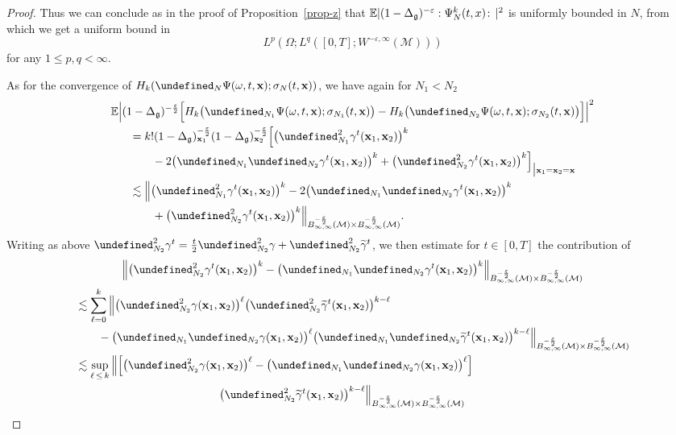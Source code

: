 \documentclass[AHL,Unicode,longabstracts,published]{cedram}
\newcommand{\E}{\mathbb{E}}
\let\P= \undefined
\newcommand{\P}{\mathbf{P}}
\newcommand{\x}{\mathbf{x}}
\newcommand{\M}{\mathcal{M}}
\newcommand{\g}{\mathfrak{g}}
\newcommand{\Dlg}{\Delta_{\g}}
\newcommand{\eps}{\varepsilon}
\newcommand{\s}{\sigma}
\newcommand{\wt}{\widetilde}
\renewcommand{\o}{\omega}
\renewcommand{\O}{\Omega}
\newcommand{\les}{\lesssim}
\begin{document}
\begin{proof}
Thus we can conclude as in the proof of Proposition~\ref{prop-z} that $ \E|(1-\Dlg)^{-\eps}:\linebreak\Psi_N^k(t,x)\!:\,|^2$ is uniformly bounded in $N$, from which we get a uniform bound in 
\[
L^p\left(\O;L^q([0,T];W^{-\eps,\infty}(\M))\right)
\]
for any $1\leq p,q<\infty$.

As for the convergence of $H_k(\P_N\Psi(\o,t,\x);\s_N(t,\x))$, we have again for $N_1< N_2$
\begin{multline*}
\E\Big|(1-\Dlg)^{-\frac\eps2}\Big[H_k\big(\P_{N_1}\Psi(\o,t,\x);\s_{N_1}(t,\x)\big)-H_k\big(\P_{N_2}\Psi(\o,t,\x);\s_{N_2}(t,\x)\big)\Big]\Big|^2\\
\begin{aligned}
&=k!(1-\Dlg)_{\x_1}^{-\frac\eps2}(1-\Dlg)_{\x_2}^{-\frac\eps2}\Big[\big(\P_{N_1}^2\gamma^t(\x_1,\x_2)\big)^k\\
&\qquad-2\big(\P_{N_1}\P_{N_2}\gamma^t(\x_1,\x_2)\big)^k+\big(\P_{N_2}^2\gamma^t(\x_1,\x_2)\big)^k\Big]_{\big|\x_1=\x_2=\x}\\
&\les \Big\|\big(\P_{N_1}^2\gamma^t(\x_1,\x_2)\big)^k-2\big(\P_{N_1}\P_{N_2}\gamma^t(\x_1,\x_2)\big)^k\\
&\qquad+\big(\P_{N_2}^2\gamma^t(\x_1,\x_2)\big)^k\Big\|_{B^{-\frac{\eps}2}_{\infty,\infty}(\M)\times B^{-\frac{\eps}2}_{\infty,\infty}(\M)}.
\end{aligned}
\end{multline*}
Writing as above $\P_{N_2}^2\gamma^t = \frac{t}2\P_{N_2}^2\gamma + \P_{N_2}^2\wt\gamma^t$, we then estimate for $t\in [0,T]$ the contribution of
\begin{multline*}
\Big\|\big(\P_{N_2}^2\gamma^t(\x_1,\x_2)\big)^k-\big(\P_{N_1}\P_{N_2}\gamma^t(\x_1,\x_2)\big)^k\Big\|_{B^{-\frac{\eps}2}_{\infty,\infty}(\M)\times B^{-\frac{\eps}2}_{\infty,\infty}(\M)}\\
\begin{aligned}
&\les \sum_{\ell=0}^k \Big\|\big(\P_{N_2}^2\gamma(\x_1,\x_2)\big)^{\ell}\big(\P_{N_2}^2\wt\gamma^t(\x_1,\x_2)\big)^{k-\ell}\\
&\qquad-\big(\P_{N_1}\P_{N_2}\gamma(\x_1,\x_2)\big)^{\ell}\big(\P_{N_1}\P_{N_2}\wt\gamma^t(\x_1,\x_2)\big)^{k-\ell}\Big\|_{B^{-\frac{\eps}2}_{\infty,\infty}(\M)\times B^{-\frac{\eps}2}_{\infty,\infty}(\M)}\\
&\les \sup_{\ell\,\le\,k} \Big\|\Big[\big(\P_{N_2}^2\gamma(\x_1,\x_2)\big)^{\ell}-\big(\P_{N_1}\P_{N_2}\gamma(\x_1,\x_2)\big)^{\ell}\Big]\\
&\mkern230mu\big(\P_{N_2}^2\wt\gamma^t(\x_1,\x_2)\big)^{k-\ell}\Big\|_{B^{-\frac{\eps}2}_{\infty,\infty}(\M)\times B^{-\frac{\eps}2}_{\infty,\infty}(\M)}\\

\end{aligned}
\end{multline*}
\end{proof}
\end{document}
